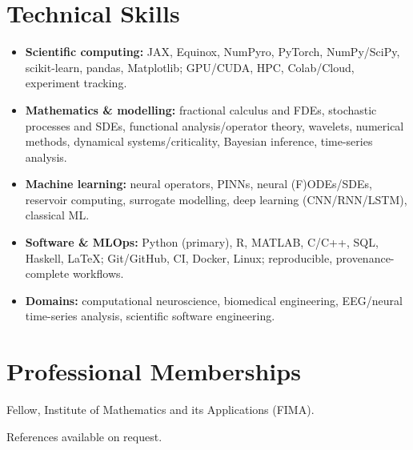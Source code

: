 \documentclass[10pt,a4paper]{article}
\begin{document}
\section{Technical Skills}
\begin{itemize}[leftmargin=1.3em,itemsep=1pt,topsep=2pt]
  \item \textbf{Scientific computing:} JAX, Equinox, NumPyro, PyTorch, NumPy/SciPy, scikit-learn, pandas, Matplotlib; GPU/CUDA, HPC, Colab/Cloud, experiment tracking.
  \item \textbf{Mathematics \& modelling:} fractional calculus and FDEs, stochastic processes and SDEs, functional analysis/operator theory, wavelets, numerical methods, dynamical systems/criticality, Bayesian inference, time-series analysis.
  \item \textbf{Machine learning:} neural operators, PINNs, neural (F)ODEs/SDEs, reservoir computing, surrogate modelling, deep learning (CNN/RNN/LSTM), classical ML.
  \item \textbf{Software \& MLOps:} Python (primary), R, MATLAB, C/C++, SQL, Haskell, \LaTeX; Git/GitHub, CI, Docker, Linux; reproducible, provenance-complete workflows.
  \item \textbf{Domains:} computational neuroscience, biomedical engineering, EEG/neural time-series analysis, scientific software engineering.
\end{itemize}

\section{Professional Memberships}
Fellow, Institute of Mathematics and its Applications (FIMA).

\vspace{4pt}
{\small\color{muted} References available on request.}
\end{document}
